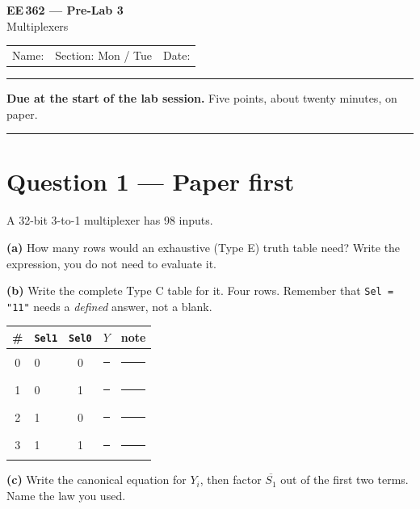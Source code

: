 \documentclass[11pt]{article}
\newcommand{\code}[1]{\texttt{#1}}
\newcommand{\answerbox}[1]{\vspace{2pt}\fbox{\parbox[c][#1][c]{\dimexpr\linewidth-2\fboxsep-2\fboxrule}{\ }}\vspace{4pt}}
\begin{document}
\begin{center}
{\Large\bfseries EE\,362 --- Pre-Lab 3}\\[2pt]
{\large Multiplexers}\\[6pt]
\begin{tabular}{@{}p{6.5cm}p{4cm}p{4cm}@{}}
Name: \hrulefill & Section: Mon / Tue & Date: \hrulefill
\end{tabular}
\end{center}

\vspace{2pt}\hrule\vspace{4pt}

{\small\textbf{Due at the start of the lab session.} Five points, about twenty
minutes, on paper.}

\vspace{4pt}\hrule

\section*{Question 1 --- Paper first}

A 32-bit 3-to-1 multiplexer has 98 inputs.

\textbf{(a)} How many rows would an exhaustive (Type E) truth table need? Write
the expression, you do not need to evaluate it.

\answerbox{1.2cm}

\textbf{(b)} Write the complete Type C table for it. Four rows. Remember that
\code{Sel = "11"} needs a \emph{defined} answer, not a blank.

\begin{center}
\begin{tabular}{clc@{\hskip 8pt}||@{\hskip 8pt}l@{\hskip 20pt}l}
\toprule
\# & \code{Sel1} & \code{Sel0} & $Y$ & note \\
\midrule
0 & 0 & 0 & \rule{2.2cm}{0.4pt} & \rule{4.5cm}{0.4pt} \\[4pt]
1 & 0 & 1 & \rule{2.2cm}{0.4pt} & \rule{4.5cm}{0.4pt} \\[4pt]
2 & 1 & 0 & \rule{2.2cm}{0.4pt} & \rule{4.5cm}{0.4pt} \\[4pt]
3 & 1 & 1 & \rule{2.2cm}{0.4pt} & \rule{4.5cm}{0.4pt} \\
\bottomrule
\end{tabular}
\end{center}

\textbf{(c)} Write the canonical equation for $Y_i$, then factor $\overline{S_1}$
out of the first two terms. Name the law you used.
\end{document}
